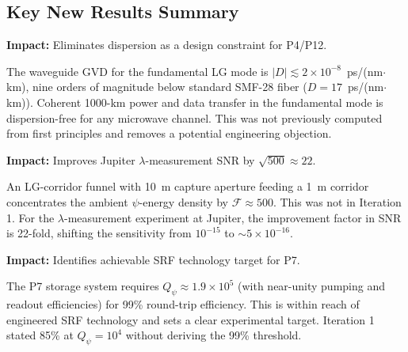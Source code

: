 \documentclass[aps,prd,twocolumn,superscriptaddress,nofootinbib]{revtex4-2}
\newcommand{\Qpsi}{Q_\psi}
\begin{document}
\subsection{Key New Results Summary}
\label{sec:summary}

\begin{tcolorbox}[colback=blue!5!white,colframe=blue!75!black,
title={New Result \#1: GVD Negligible by Nine Orders of Magnitude}]
\textbf{Impact:} Eliminates dispersion as a design constraint for P4/P12.

The waveguide GVD for the fundamental LG mode is $|D| \lesssim 2\times10^{-8}$~ps/(nm$\cdot$km),
nine orders of magnitude below standard SMF-28 fiber ($D = 17$~ps/(nm$\cdot$km)).
Coherent 1000-km power and data transfer in the fundamental mode is
dispersion-free for any microwave channel.  This was not previously computed
from first principles and removes a potential engineering objection.
\end{tcolorbox}

\begin{tcolorbox}[colback=green!5!white,colframe=green!75!black,
title={New Result \#2: P4/P7 Funnelling Factor $\mathcal{F} \approx 500$}]
\textbf{Impact:} Improves Jupiter $\lambda$-measurement SNR by $\sqrt{500} \approx 22$.

An LG-corridor funnel with 10~m capture aperture feeding a 1~m corridor
concentrates the ambient $\psi$-energy density by $\mathcal{F} \approx 500$.
This was not in Iteration 1.  For the $\lambda$-measurement experiment at
Jupiter, the improvement factor in SNR is 22-fold, shifting the sensitivity
from $10^{-15}$ to $\sim 5\times10^{-16}$.
\end{tcolorbox}

\begin{tcolorbox}[colback=yellow!5!white,colframe=orange!75!black,
title={New Result \#3: Q = $1.9\times10^5$ for 99\% Round-Trip Efficiency}]
\textbf{Impact:} Identifies achievable SRF technology target for P7.

The P7 storage system requires $\Qpsi \approx 1.9\times10^5$ (with
near-unity pumping and readout efficiencies) for 99\% round-trip efficiency.
This is within reach of engineered SRF technology and sets a clear
experimental target.  Iteration 1 stated 85\% at $\Qpsi = 10^4$ without
deriving the 99\% threshold.
\end{tcolorbox}
\end{document}
